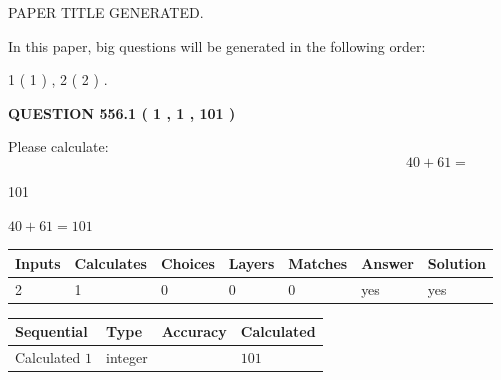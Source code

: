 \documentclass[12pt]{article}
\begin{document}
   
 PAPER TITLE GENERATED.
   
   
   
\vspace{0.2in}
   
In this paper, big questions will be generated in the following order: 
   
   
   1 ( 1 )
 ,
   2 ( 2 )
 .
  
\vspace{0.2in}
  
{\textbf{\Large{QUESTION
556.1 
 ( 1 , 1 , 101 )
}}}
  
  
 
Please calculate:
\begin{equation}
40 +  %
61 = \nonumber
\end{equation}
 
 
 
\noindent{}
 
 

101
 
 
\noindent{}
 
 

 
 
 
\noindent{}
 
 

$ %
40 +  %
61=   %
101$
 
 
\noindent{}
 
 

 
   
   
   
   
\noindent\begin{tabular}{|l|l|l|l|l|l|l|}
 \hline
Inputs & Calculates & Choices & Layers & Matches & Answer & Solution \\ \hline
 2  & 
 1  & 
 0
  & 
 0  & 
 0  & 
  yes & 
  yes 
  \\ \hline
 \end{tabular}
   
   
   
   
\noindent{}
   
   
  
  
\noindent\begin{tabular}{|l|l|l|l|}
\hline
 Sequential & Type & Accuracy & Calculated \\ 
\hline
 
 
  Calculated $  1 $ & integer &  & 
  $ 101 $ 
 \\  \hline  
 \end{tabular}
   
\end{document}
